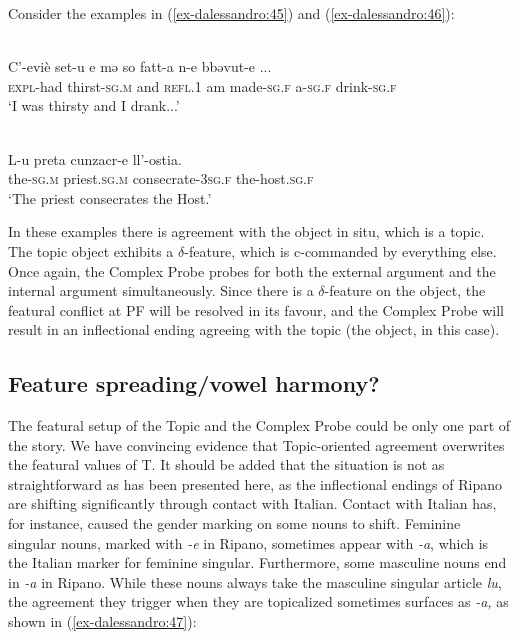 \documentclass[output=paper
,modfonts
,nonflat]{langsci/langscibook}
\begin{document}
Consider the examples in (\ref{ex-dalessandro:45}) and (\ref{ex-dalessandro:46}):

\begin{exe}
	\ex \label{ex-dalessandro:45}\citet[59]{Rossi2008}\\
	\gll C’-eviè   set-u     e   mə   so   fatt-a     n-e   bbəvut-e ...\\
	\textsc{expl-}had  thirst-\textsc{sg.m} and  \textsc{refl.1} am  made-\textsc{sg.f} a-\textsc{sg.f} drink-\textsc{sg.f}\\
	\glt `I was thirsty and I drank...'
\end{exe}
\begin{exe}
	\ex\label{ex-dalessandro:46}\citet[87]{Rossi2008}\\
	\gll L-u   preta     cunzacr-e     ll’-ostia.\\
	the-\textsc{sg.m} priest.\textsc{sg.m} consecrate-\textsc{3sg.f} the-host.\textsc{sg.f}\\
	\glt `The priest consecrates the Host.'
\end{exe}
In these examples there is agreement with the object in situ, which is a topic. The topic object exhibits a $\delta $-feature, which is c-commanded by everything else. Once again, the Complex Probe probes for both the external argument and the internal argument simultaneously. Since there is a $\delta $-feature on the object, the featural conflict at PF will be resolved in its favour, and the Complex Probe will result in an inflectional ending agreeing with the topic (the object, in this case).

\subsection{Feature spreading/vowel harmony?}\label{sec-dalessandro:5.3}
The featural setup of the Topic and the Complex Probe could be only one part of the story. We have convincing evidence that Topic-oriented agreement overwrites the featural values of T. It should be added that the situation is not as straightforward as has been presented here, as the inflectional endings of Ripano are shifting significantly through contact with Italian.
Contact with Italian has, for instance, caused the gender marking on some nouns to shift. Feminine singular nouns, marked with \textit{-e} in Ripano, sometimes appear with \textit{-a}, which is the Italian marker for feminine singular. Furthermore, some masculine nouns end in \textit{-a} in Ripano. While these nouns always take the masculine singular article \textit{lu}, the agreement they trigger when they are topicalized sometimes surfaces as \textit{-a,}  as shown in (\ref{ex-dalessandro:47}):
\end{document}
